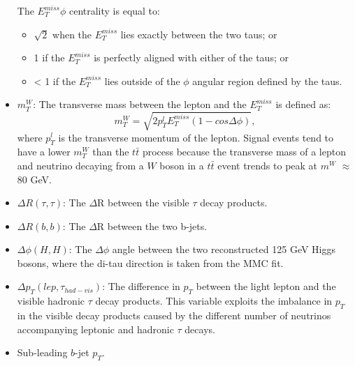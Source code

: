 \begin{itemize}
The $E^{miss}_T\phi$ centrality is equal to: 
\begin{itemize}
    \item $\sqrt{2}$ when the $E^{miss}_T$ lies exactly between the two taus; or
    \item 1 if the $E^{miss}_T$ is perfectly aligned with either of the taus; or 
    \item < 1 if the $E^{miss}_T$ lies outside of the $\phi$ angular region defined by the taus.
\end{itemize}
    \item $m_T^{W}$: The transverse mass between the lepton and the $E^{miss}_T$ is defined as: 
    \begin{equation} \label{eq:mTW} 
m_T^W =  \sqrt{2p_T^lE_T^{miss}(1-cos\Delta\phi)} , 
\end{equation}
where $p_T^l$ is the transverse momentum of the lepton. Signal events tend to have a lower $m_T^W$ than the $t\bar{t}$ process because the transverse mass of a lepton and neutrino decaying from a $W$ boson in a $t\bar{t}$ event trends to peak at $m^W$ $\approx$ 80 GeV. 
    \item $\Delta R(\tau,\tau)$: The $\Delta$R between the visible $\tau$ decay products.
    \item $\Delta R(b,b)$:  The $\Delta$R between the two b-jets.
    \item $\Delta\phi(H,H)$: The $\Delta\phi$ angle between the two reconstructed 125 GeV Higgs bosons, where the di-tau direction is taken from the MMC fit.
    \item $\Delta p_T(lep, \tau_{had-vis})$: The difference in $p_T$ between the light lepton and the visible hadronic $\tau$ decay products. This variable exploits the imbalance in $p_T$ in the visible decay products caused by the different number of neutrinos accompanying leptonic and hadronic $\tau$ decays.
    \item Sub-leading $b$-jet $p_T$.
\end{itemize}



